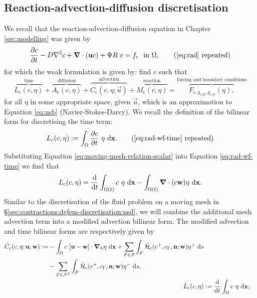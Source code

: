         \subsection{Reaction-advection-diffusion discretisation}        
            We recall that the reaction-advection-diffusion equation in Chapter \ref{sec:modelling} was given by
            \begin{equation}
                \pdv{c}{t} - D \nabla^2 c + \vec{\nabla} \cdot (\vec{u} c) + \Psi R ~ c = f_\text{c} ~ \text{ in } \Omega,
                \retag{eq:rad}%
            \end{equation}%
            for which the weak formulation is given by: find $c$ such that
            \begin{equation}
                \overbrace{L_\text{c}(c, \eta)}^{\text{time}} + \overbrace{A_\text{c}(c, \eta)}^{\text{diffusion}} + \overbrace{C_\text{c}(c, \eta; \vec{u})}^{\text{advection}} + \overbrace{M_\text{c}(c, \eta)}^{\text{reaction}} = \overbrace{F_{\text{c},g_\text{c,D},g_\text{c,N}}(\eta),}^{\text{forcing and boundary conditions}}
                \label{eq:rad-mm-discretisation}
            \end{equation}
            for all $\eta$ in some appropriate space, given $\vec{u}$, which is an approximation to Equation \eqref{eq:nsb} (Navier-Stokes-Darcy). We recall the definition of the bilinear form for discretising the time term:
            \begin{equation}
                L_\text{c}(c, \eta) := \int_\Omega \pdv{c}{t} ~ \eta \diff \vec{x}.
                \retag{eq:rad-wf-time}
            \end{equation}
            Substituting Equation \eqref{eq:moving-mesh-relation-scalar} into Equation \eqref{eq:rad-wf-time} we find that
            \begin{equation}
                L_\text{c}(c, \eta) = \dv{}{t} \int_{\Omega(t)} c ~ \eta ~\mathrm{d} \boldsymbol{\mathbf{x}} - \int_{\Omega(t)} \boldsymbol{\mathbf{\nabla}} \cdot (c \boldsymbol{\mathbf{w}}) \eta ~\mathrm{d} \boldsymbol{\mathbf{x}}.
            \end{equation}
            Similar to the discretisation of the fluid problem on a moving mesh in \S\ref{sec:contractions:dgfem-discretisation:nsd}, we will combine the additional mesh advection term into a modified advection bilinear form. The modified advection and time bilinear forms are respectively given by
            \begin{align}
                \begin{split}
                    \bar{C}_\text{c}(c, \eta; \boldsymbol{\mathbf{u}}, \boldsymbol{\mathbf{w}}) := & -\int_\Omega c ~ [\boldsymbol{\mathbf{u}} - \boldsymbol{\mathbf{w}}] \cdot \boldsymbol{\mathbf{\nabla}}_h \eta ~\mathrm{d} \boldsymbol{\mathbf{x}} + \sum_{F \in \mathcal{F}} \int_F \bar{\mathcal{H}}_\text{c}(c^+, c_\Gamma, \boldsymbol{\mathbf{n}}; \boldsymbol{\mathbf{w}})\eta^+ ~\mathrm{d} s \\ & - \sum_{F \in \mathcal{F}^\mathcal{I}} \int_F \bar{\mathcal{H}}_\text{c}(c^+, c_\Gamma, \boldsymbol{\mathbf{n}}; \boldsymbol{\mathbf{w}})\eta^- ~\mathrm{d} s,    
                \end{split}\\
                \bar{L}_\text{c}(c, \eta) & := \dv{}{t} \int_\Omega c ~ \eta ~\mathrm{d} \boldsymbol{\mathbf{x}},
            \end{align}
